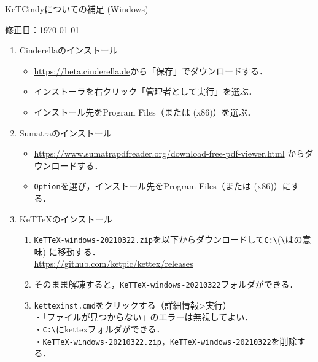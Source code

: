\documentclass{ujarticle}
\begin{document}
\begin{center}
KeTCindyについての補足 (Windows)
\end{center}

\hfill 修正日：\today

\begin{enumerate}[\bf\large 1.]

\item Cinderellaのインストール
\begin{itemize}
\item \url{https://beta.cinderella.de}から「保存」でダウンロードする．
\item インストーラを右クリック「管理者として実行」を選ぶ．
\item インストール先をProgram Files（または (x86)）を選ぶ．
\end{itemize}

\item Sumatraのインストール
\begin{itemize}
\item \url{https://www.sumatrapdfreader.org/download-free-pdf-viewer.html} からダウンロードする．
\item {\color{red}\verb|Option|を選び}，インストール先をProgram Files（または (x86)）にする．
\end{itemize}

\item KeTTeXのインストール

\begin{enumerate}[(1)]
\item \verb|KeTTeX-windows-20210322.zip|を以下からダウンロードして\verb|C:\|(\verb|\|は\yen の意味) に移動する．\\
    \hspace*{10mm}\url{https://github.com/ketpic/kettex/releases}

\item そのまま解凍すると，\verb|KeTTeX-windows-20210322|フォルダができる．
\item \verb|kettexinst.cmd|をクリックする（詳細情報>実行）\\
・「ファイルが見つからない」のエラーは無視してよい．\\
・\verb|C:\|にkettexフォルダができる．\\
・\verb|KeTTeX-windows-20210322.zip|，\verb|KeTTeX-windows-20210322|を削除する．

\end{enumerate}


\end{enumerate}
\end{document}
